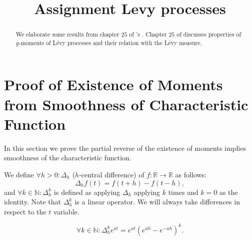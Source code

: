 \documentclass[a4paper,11pt]{article}
\title{Assignment Levy processes}
\author{}
\date{}
\begin{document}
\maketitle

\begin{abstract}
    We elaborate some results from chapter $25$ of \citeauthor{sato_levy_2013}'s  \cite{sato_levy_2013}. Chapter $25$ of \cite{sato_levy_2013} discusses properties of $g$-moments of Lévy processes and their relation with the Lévy measure.
\end{abstract}

\section{Proof of Existence of Moments from Smoothness of Characteristic Function}

In this section we prove the partial reverse of the existence of moments implies smoothness of the characteristic function.

\begin{definition}[$\Delta^{k}_{h}$]
    We define $\forall h>0: \Delta_{h}$ ($h$-central difference) of $f:\mathbb{R}\rightarrow \mathbb{R}$ as follows:
    \begin{equation}
        \Delta_{h} f(t) = f(t+h)- f(t-h),
    \end{equation}
    and $\forall k \in \mathbb{N}:\Delta^{k}_{h}$ is defined as applying $\Delta_{h}$ applying $k$ times and
    $k=0$ as the identity. Note that $\Delta^{k}_{h}$ is a linear operator. We will always take
    differences in respect to the $t$ variable.
\end{definition}

\begin{lemma}[$\Delta^{k}_{h} e^{at}$]
    \begin{equation}
        \forall k \in \mathbb{N}: \Delta^{k}_{h} e^{at} =  e^{at} \left( e^{ah} - e^{-ah} \right)^{k}.
    \end{equation}
\end{lemma}
\end{document}
